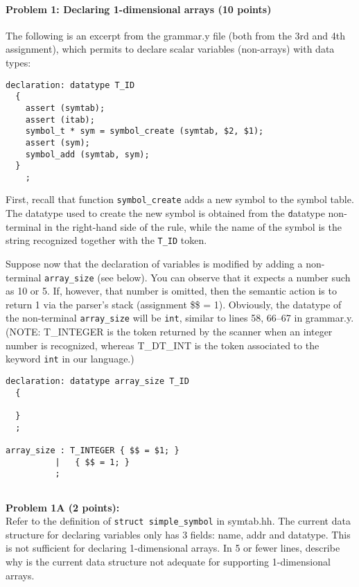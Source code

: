 
\paragraph{Problem 1: Declaring 1-dimensional arrays (10 points)}
The following is an excerpt from the grammar.y file (both from the 3rd and 4th assignment),
which permits to declare scalar variables (non-arrays) with data types:

\begin{lstlisting}
declaration: datatype T_ID 
  { 
    assert (symtab);
    assert (itab);
    symbol_t * sym = symbol_create (symtab, $2, $1); 
    assert (sym);
    symbol_add (symtab, sym);
  }
    ;
\end{lstlisting}

First, recall that function \texttt{symbol\_create} adds a new symbol
to the symbol table. The datatype used to create the new symbol is obtained from the {\texttt datatype} non-terminal
in the right-hand side of the rule, while the name of the symbol is the string
recognized together with the \texttt{T\_ID} token.

Suppose now that the declaration of variables is modified by adding a non-terminal \texttt{array\_size} 
(see below). You can observe that it expects a number such as 10 or 5.  If, however, that number
is omitted, then the semantic action is to return 1 via the parser's stack (assignment \$\$ = 1). 
Obviously, the datatype of
the non-terminal \texttt{array\_size} will be \texttt{int}, similar to lines 58, 66--67 in grammar.y.
(NOTE: T\_INTEGER is the token returned by the scanner when an integer number is recognized,
whereas T\_DT\_INT is the token associated to the keyword \texttt{int} in our language.)

\begin{lstlisting}
declaration: datatype array_size T_ID 
  { 

  }
  ;

array_size : T_INTEGER { $$ = $1; }
          |   { $$ = 1; }
          ;
        
\end{lstlisting}


{\bf Problem 1A (2 points):}
\\
Refer to the definition of \texttt{struct simple\_symbol} in symtab.hh.
The current data structure for declaring variables only has 3 fields: name, addr and datatype.
This is not sufficient for declaring 1-dimensional arrays. In 5 or fewer lines, describe why
is the current data structure not adequate for supporting 1-dimensional arrays.


